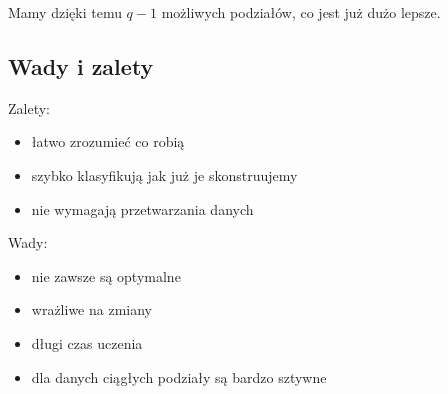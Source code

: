 Mamy dzięki temu \( q - 1 \) możliwych podziałów, co jest już dużo lepsze.

\subsection{Wady i zalety}

Zalety:
\begin{itemize}
    \item łatwo zrozumieć co robią
    \item szybko klasyfikują jak już je skonstruujemy
    \item nie wymagają przetwarzania danych
\end{itemize}
Wady:
\begin{itemize}
    \item nie zawsze są optymalne
    \item wrażliwe na zmiany
    \item długi czas uczenia
    \item dla danych ciągłych podziały są bardzo sztywne
\end{itemize}